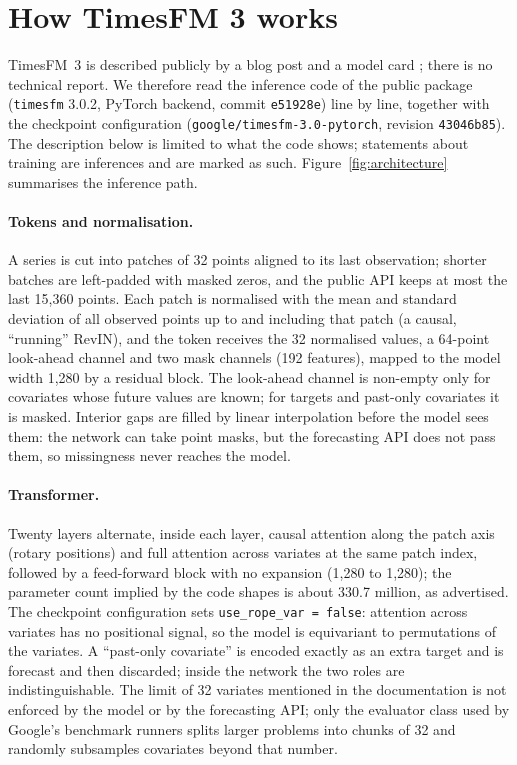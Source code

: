 \section{How TimesFM 3 works}
\label{sec:mechanism}

TimesFM~3 is described publicly by a blog post and a model card \citep{jain2026timesfm3,timesfm2026hf}; there is no technical report. We
therefore read the inference code of the public package (\texttt{timesfm} 3.0.2, PyTorch backend, commit \texttt{e51928e}) line by
line, together with the checkpoint configuration (\texttt{google/timesfm-3.0-pytorch}, revision \texttt{43046b85}). The
description below is limited to what the code shows; statements about training are inferences and are marked as such.
Figure~\ref{fig:architecture} summarises the inference path.



\paragraph{Tokens and normalisation.} A series is cut into patches of 32 points aligned to its last observation; shorter batches
are left-padded with masked zeros, and the public API keeps at most the last 15{,}360 points. Each patch is normalised with the
mean and standard deviation of all observed points up to and including that patch (a causal, ``running'' RevIN), and the token
receives the 32 normalised values, a 64-point look-ahead channel and two mask channels (192 features), mapped to the model width
1{,}280 by a residual block. The look-ahead channel is non-empty only for covariates whose future values are known; for targets and
past-only covariates it is masked. Interior gaps are filled by linear interpolation before the model sees them: the network can take
point masks, but the forecasting API does not pass them, so missingness never reaches the model.

\paragraph{Transformer.} Twenty layers alternate, inside each layer, causal attention along the patch axis (rotary positions) and
full attention across variates at the same patch index, followed by a feed-forward block with no expansion (1{,}280 to 1{,}280);
the parameter count implied by the code shapes is about 330.7 million, as advertised. The checkpoint configuration sets
\texttt{use\_rope\_var = false}: attention across variates has no positional signal, so the model is equivariant to permutations of
the variates. A ``past-only covariate'' is encoded exactly as an extra target and is forecast and then discarded; inside the network
the two roles are indistinguishable. The limit of 32 variates mentioned in the documentation is not enforced by the model or by the
forecasting API; only the evaluator class used by Google's benchmark runners splits larger problems into chunks of 32 and randomly
subsamples covariates beyond that number.

